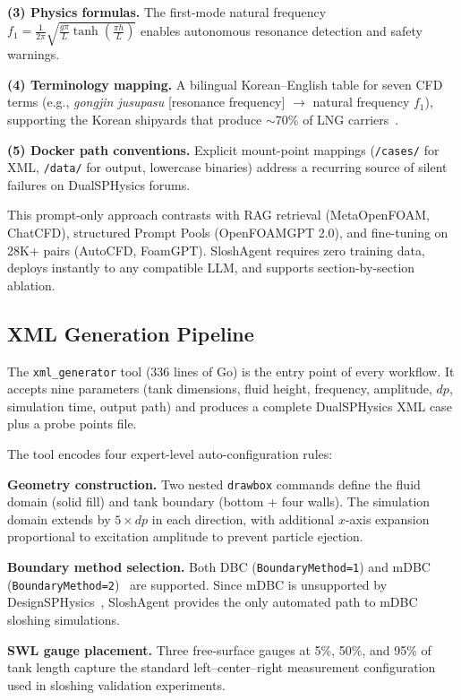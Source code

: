 \documentclass[11pt]{article}
\begin{document}
\textbf{(3) Physics formulas.} The first-mode natural frequency $f_1 = \frac{1}{2\pi}\sqrt{\frac{g\pi}{L}\tanh\!\left(\frac{\pi h}{L}\right)}$ enables autonomous resonance detection and safety warnings.

\textbf{(4) Terminology mapping.} A bilingual Korean--English table for seven CFD terms (e.g., \textit{gongjin jusupasu} [resonance frequency] $\rightarrow$ natural frequency $f_1$), supporting the Korean shipyards that produce {$\sim$}70\% of LNG carriers~\citep{lloyd2024}.

\textbf{(5) Docker path conventions.} Explicit mount-point mappings (\texttt{/cases/} for XML, \texttt{/data/} for output, lowercase binaries) address a recurring source of silent failures on DualSPHysics forums.

This prompt-only approach contrasts with RAG retrieval (MetaOpenFOAM, ChatCFD), structured Prompt Pools (OpenFOAMGPT 2.0), and fine-tuning on 28K+ pairs (AutoCFD, FoamGPT). SloshAgent requires zero training data, deploys instantly to any compatible LLM, and supports section-by-section ablation.

\subsection{XML Generation Pipeline}

The \texttt{xml\_generator} tool (336 lines of Go) is the entry point of every workflow. It accepts nine parameters (tank dimensions, fluid height, frequency, amplitude, $\mathit{dp}$, simulation time, output path) and produces a complete DualSPHysics XML case plus a probe points file.

The tool encodes four expert-level auto-configuration rules:

\textbf{Geometry construction.} Two nested \texttt{drawbox} commands define the fluid domain (solid fill) and tank boundary (bottom + four walls). The simulation domain extends by $5{\times}\mathit{dp}$ in each direction, with additional $x$-axis expansion proportional to excitation amplitude to prevent particle ejection.

\textbf{Boundary method selection.} Both DBC (\texttt{BoundaryMethod=1}) and mDBC (\texttt{BoundaryMethod=2})~\citep{english2021mdbc} are supported. Since mDBC is unsupported by DesignSPHysics~\citep{vieira2017designsphysics}, SloshAgent provides the only automated path to mDBC sloshing simulations.

\textbf{SWL gauge placement.} Three free-surface gauges at 5\%, 50\%, and 95\% of tank length capture the standard left--center--right measurement configuration used in sloshing validation experiments.
\end{document}
